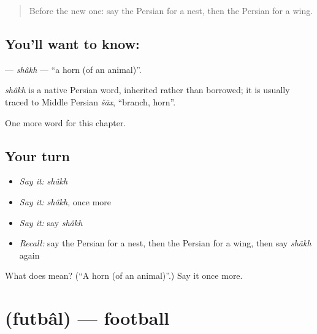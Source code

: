 \label{lesson:FA-C245-shakh}



\begin{quote}
Before the new one: say the Persian for a nest, then the Persian for a wing.
\end{quote}

\subsection*{You'll want to know: }
\textbf{} — \emph{shâkh} — \textquotedblleft{}a horn (of an animal)\textquotedblright{}.

\begin{cousinweb}
\emph{shâkh} is a native Persian word, inherited rather than borrowed; it is usually traced to Middle Persian \emph{šāx}, \textquotedblleft{}branch, horn\textquotedblright{}.
\end{cousinweb}

\begin{grammarlens}[title={What you've built}]
One more word for this chapter.
\end{grammarlens}

\subsection*{Your turn}
\begin{itemize}
\raggedright
  \item \emph{Say it:} \emph{shâkh}
  \item \emph{Say it:} \emph{shâkh}, once more
  \item \emph{Say it:} say \emph{shâkh}
  \item \emph{Recall:} say the Persian for a nest, then the Persian for a wing, then say \emph{shâkh} again
\end{itemize}

\begin{tcolorbox}[breakable,colback=teal!4,colframe=teal!35!black,title={Before you move on}]
What does  mean? (\textquotedblleft{}A horn (of an animal)\textquotedblright{}.) Say it once more.
\end{tcolorbox}
\section[\texorpdfstring{\fa{فوتبال} (futbâl)}{فوتبال (futbâl)}]{ (futbâl) — football}

\label{lesson:FA-C245-futbal}



